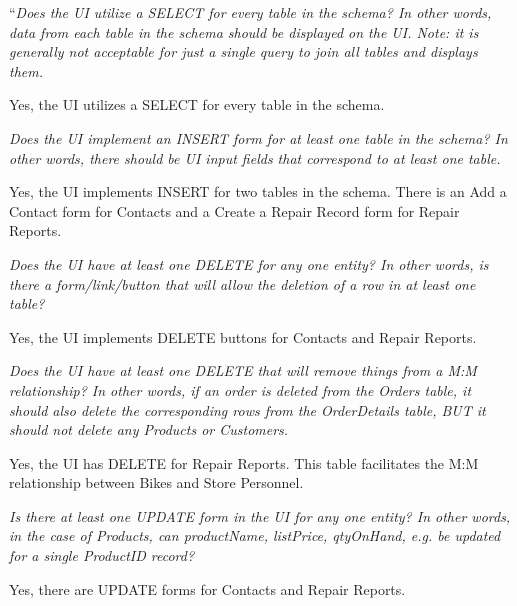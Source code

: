 \documentclass{article}
\begin{document}
\begin{tcolorbox}[colback=secondarycolor, colframe=primarycolor, title=\textbf{Step 3: Peer Review 2 - Paula Tica}]
``\textit{Does the UI utilize a SELECT for every table in the schema? In other words, data from each table in the schema should be displayed on the UI. Note: it is generally not acceptable for just a single query to join all tables and displays them.}

\vspace{0.05cm}
Yes, the UI utilizes a SELECT for every table in the schema.

\vspace{0.2cm}
\textit{Does the UI implement an INSERT form for at least one table in the schema? In other words, there should be UI input fields that correspond to at least one table.}

\vspace{0.05cm}
Yes, the UI implements INSERT for two tables in the schema. There is an Add a Contact form for Contacts and a Create a Repair Record form for Repair Reports.

\vspace{0.2cm}
\textit{Does the UI have at least one DELETE for any one entity? In other words, is there a form/link/button that will allow the deletion of a row in at least one table?}

\vspace{0.05cm}
Yes, the UI implements DELETE buttons for Contacts and Repair Reports.

\vspace{0.2cm}
\textit{Does the UI have at least one DELETE that will remove things from a M:M relationship? In other words, if an order is deleted from the Orders table, it should also delete the corresponding rows from the OrderDetails table, BUT it should not delete any Products or Customers.}

\vspace{0.05cm}
Yes, the UI has DELETE for Repair Reports. This table facilitates the M:M relationship between Bikes and Store Personnel.

\vspace{0.2cm}
\textit{Is there at least one UPDATE form in the UI for any one entity? In other words, in the case of Products, can productName, listPrice, qtyOnHand, e.g. be updated for a single ProductID record?}

\vspace{0.05cm}
Yes, there are UPDATE forms for Contacts and Repair Reports.


\end{tcolorbox}
\end{document}
